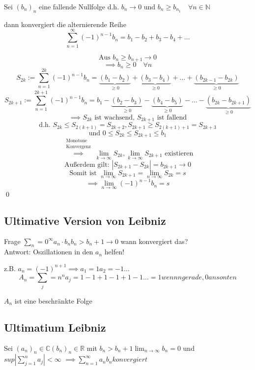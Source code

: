 \documentclass[fleqn]{scrbook}
\renewenvironment{proof}{{\bfseries Beweis }}{\qed}
\begin{document}
Sei $(b_n)_n$ eine fallende Nullfolge d.h. $b_n \to 0$ und $b_n \geq b_{n_1} \quad \forall n \in \mathbb{N}$ 

dann konvergiert die alternierende Reihe
\[\sum_{n=1}^\infty (-1)^{n-1} b_n = b_1-b_2+b_3-b_4+\ldots \]

\begin{proof}
 \[\text{Aus } b_n \geq b_{n+1} \to 0\]
 \[\implies b_n \geq 0 \quad \forall n\]
 \[S_{2k}:=\sum_{n=1}^{2k} (-1)^{n-1} b_n = \underbrace{(b_1-b_2)}_{\geq 0}+\underbrace{(b_3-b_4)}_{\geq 0}+\ldots+\underbrace{(b_{2k-1}-b_{2k})}_{\geq 0}\]
 \[S_{2k+1}:=\sum_{n=1}^{2k+1} (-1)^{n-1} b_n = b_1 - \underbrace{(b_2-b_3)}_{\geq 0}-\underbrace{(b_4-b_5)}_{\geq 0}-\ldots-\underbrace{(b_{2k}-b_{2k+1})}_{\geq 0}\]
 \[\implies S_{2k} \text{ ist wachsend, } S_{2k+1} \text{ ist fallend}\]
 \[\text{d.h. } S_{2k} \leq S_{2(k+1)} = S_{2k+2}, S_{2k+1} \geq S_{2(k+1)+1} = S_{2k+3}\]
 \[\text{und } 0\leq S_{2k} \leq S_{2k+1} \leq b_1\]
 \[\stackrel{\begin{array}{l}\text{Monotone}\\\text{Konvergenz}\end{array}}{\implies} \lim_{k \to \infty} S_{2k}, \lim_{k \to \infty} S_{2k+1} \text{ existieren} \]
 \[\text{Außerdem gilt: } |S_{2k+1}-S_{2k}|=b_{2k+1} \to 0\]
 \[\text{Somit ist } \lim_{n\to \infty} S_{2k+1} = \lim_{n\to \infty} S_{2k} = s\]
 \[\implies \lim_{n \to \infty} (-1)^{n-1} b_n=s\] 
\end{proof}

\subsection{Ultimative Version von Leibniz}
Frage $\sum_n=0^{\infty} a_n \cdot b_n b_n > b_n+1 \to 0$ wann konvergiert das? \\
Antwort: Oszillationen in den $a_n$ helfen!

z.B. $a_n = (-1)^{n+1} \implies a_1 = 1 a_2 = -1 \ldots $
$$A_n = \sum_j=n^{n} a_j = 1-1+1-1+1-1 \ldots = 1 wenn n gerade, 0 ansonten$$

$A_n$ ist eine beschränkte Folge

\subsection{Ultimatium Leibniz}
Sei $(a_n)_n \in \mathbb{C} (b_n)_n \in \mathbb{R}$ mit $b_n > b_n+1 \lim_{n \to \infty} b_{n} = 0 $ und $sup | \sum_{j=1}^{n} a_j| < \infty$
$\implies  \sum_{n=1}^{\infty} a_n b_n konvergiert$
\end{document}
